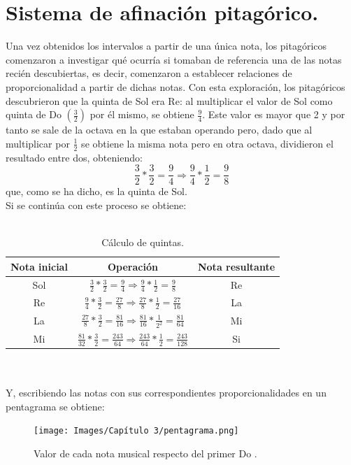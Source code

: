 \documentclass[a4paper, openright, 11pt, titlepage]{report}
\theoremstyle{definition}\newtheorem{defin}[propo]{Definition}
\theoremstyle{definition}\newtheorem{obser}[propo]{Remark}
\theoremstyle{definition}\newtheorem{ejem}[propo]{Ejemplo}
\theoremstyle{definition}\newtheorem{algoritmo}[propo]{Algoritmo}
\begin{document}
\section{Sistema de afinación pitagórico.}
Una vez obtenidos los intervalos a partir de una única nota, los pitagóricos comenzaron a investigar qué ocurría si tomaban de referencia una de las notas recién descubiertas, es decir, comenzaron a establecer relaciones de proporcionalidad a partir de dichas notas. Con esta exploración, los pitagóricos descubrieron que la quinta de Sol era Re: al multiplicar el valor de Sol como quinta de Do $(\frac{3}{2})$ por él mismo, se obtiene $\frac{9}{4}$. Este valor es mayor que 2 y por tanto se sale de la octava en la que estaban operando pero, dado que al multiplicar por $\frac{1}{2}$ se obtiene la misma nota pero en otra octava, dividieron el resultado entre dos, obteniendo: $$\frac{3}{2}*\frac{3}{2} = \frac{9}{4} \Longrightarrow \frac{9}{4}*\frac{1}{2} = \frac{9}{8}$$
que, como se ha dicho, es la quinta de Sol. \\
Si se continúa con este proceso se obtiene:\\\\
\begin{table}
\centering
\begin{tabular}{c|c|c}
\hline
     Nota inicial & Operación & Nota resultante \\
     \hline \hline
     Sol & $\frac{3}{2}*\frac{3}{2} = \frac{9}{4} \Longrightarrow \frac{9}{4}*\frac{1}{2} = \frac{9}{8}$ & Re \\
     Re & $\frac{9}{4}*\frac{3}{2} = \frac{27}{8} \Longrightarrow \frac{27}{8}*\frac{1}{2} = \frac{27}{16}$ & La \\
     La & $\frac{27}{8}*\frac{3}{2} = \frac{81}{16} \Longrightarrow \frac{81}{16}*\frac{1}{2^{2}} = \frac{81}{64}$ & Mi\\
     Mi & $\frac{81}{32}*\frac{3}{2} = \frac{243}{64} \Longrightarrow \frac{243}{64}*\frac{1}{2} = \frac{243}{128}$ & Si \\
     \hline
\end{tabular}
\caption{Cálculo de quintas.}
\end{table}
\\\\
Y, escribiendo las notas con sus correspondientes proporcionalidades en un pentagrama se obtiene:
\begin{figure}[H]
    \centering
    \texttt{[image: Images/Capítulo 3/pentagrama.png]}
    \caption{Valor de cada nota musical respecto del primer Do .}
\end{figure}
\end{document}
